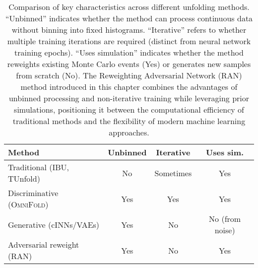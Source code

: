  \begin{table}
            \centering
            \caption[Comparison of unfolding method characteristics]{Comparison of key characteristics across different unfolding methods. ``Unbinned'' indicates whether the method can process continuous data without binning into fixed histograms. ``Iterative'' refers to whether multiple training iterations are required (distinct from neural network training epochs). ``Uses simulation'' indicates whether the method reweights existing Monte Carlo events (Yes) or generates new samples from scratch (No). The Reweighting Adversarial Network (RAN) method introduced in this chapter combines the advantages of unbinned processing and non-iterative training while leveraging prior simulations, positioning it between the computational efficiency of traditional methods and the flexibility of modern machine learning approaches.}
            \label{tab:unfold_methods}
            \begin{tabular}{lccc}
                \toprule
                \textbf{Method} & \textbf{Unbinned} & \textbf{Iterative} & \textbf{Uses sim.} \\
                \midrule
                Traditional (IBU, TUnfold) & No & Sometimes & Yes\\
                Discriminative (\textsc{OmniFold})      & Yes & Yes & Yes \\
                Generative (cINNs/VAEs)             & Yes & No  & No (from noise)\\
                Adversarial reweight (RAN)        & Yes & No  & Yes \\
                \bottomrule
            \end{tabular}
        \end{table}